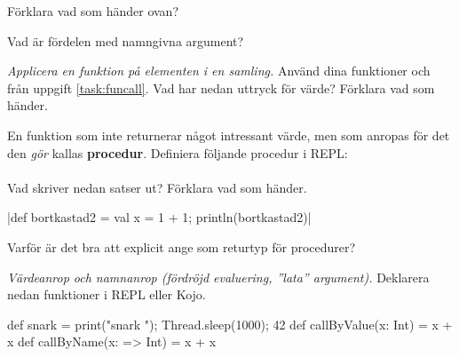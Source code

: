 \Subtask Förklara vad som händer ovan?

\Subtask\Pen Vad är fördelen med namngivna argument?



\Task \emph{Applicera en funktion på elementen i en samling.} Använd dina funktioner  och  från uppgift \ref{task:funcall}. Vad har nedan uttryck för värde? Förklara vad som händer.

\Subtask {}

\Subtask {}

\Subtask {}

\Subtask {}

\Subtask {}

\Subtask {}

\Subtask {}

\Subtask {}



\Task En funktion som inte returnerar något intressant värde, men som anropas för det den \emph{gör} kallas \textbf{procedur}. Definiera följande procedur i REPL: \\ 
 \\
Vad skriver nedan satser ut? Förklara vad som händer.

\Subtask {}

\Subtask {}

\Subtask {}

\Subtask {}

\Subtask {}

\Subtask \code|def bortkastad2 = {val x = 1 + 1}; println(bortkastad2)|

\Subtask\Pen Varför är det bra att explicit ange  som returtyp för procedurer?


\Task \emph{Värdeanrop och namnanrop (fördröjd evaluering, ''lata'' argument).} Deklarera nedan funktioner i REPL eller Kojo.

\begin{Code}
def snark = {print("snark "); Thread.sleep(1000); 42}
def callByValue(x: Int) = x + x
def callByName(x: => Int) = x + x
\end{Code}

